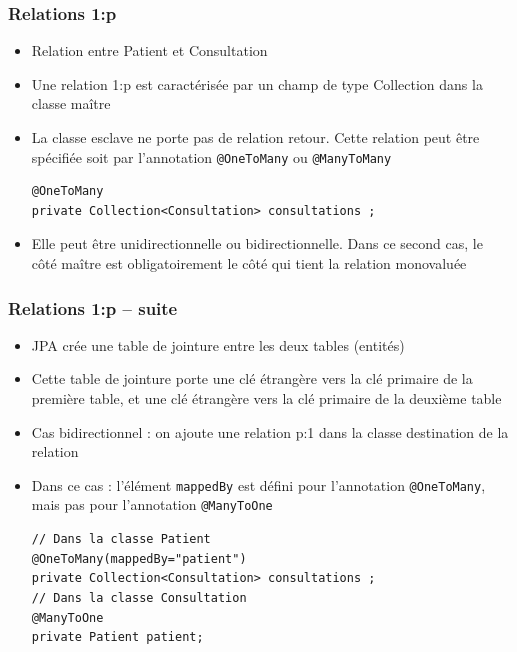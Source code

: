 \documentclass[aspectratio=169,10pt]{beamer}
\begin{document}
\begin{frame}[fragile]
	\frametitle{Relations 1:p}
	
	\begin{itemize}
		\item Relation entre Patient et Consultation 
		\item Une relation 1:p est caractérisée par un champ de type Collection dans la classe maître
		\item La classe esclave ne porte pas de relation retour. Cette relation peut être spécifiée soit par l'annotation \texttt{@OneToMany} ou \texttt{@ManyToMany}
\begin{lstlisting}
@OneToMany
private Collection<Consultation> consultations ;
\end{lstlisting}		
		\item Elle peut être unidirectionnelle ou bidirectionnelle. Dans ce second cas, le côté maître est obligatoirement le côté qui tient la relation monovaluée
	\end{itemize}

\end{frame}

\begin{frame}[fragile]
\frametitle{Relations 1:p -- suite}

\begin{itemize}
		\item JPA crée une table de jointure entre les deux tables (entités)
		\item Cette table de jointure porte une clé étrangère vers la clé primaire de la première table, et une clé étrangère vers la clé primaire de la deuxième table		
		\item Cas bidirectionnel :  on ajoute une relation p:1 dans la classe destination de la relation
		\item Dans ce cas : l'élément \texttt{mappedBy} est défini pour l'annotation \texttt{@OneToMany}, mais pas pour l'annotation \texttt{@ManyToOne}
\begin{lstlisting}
// Dans la classe Patient
@OneToMany(mappedBy="patient")
private Collection<Consultation> consultations ;
// Dans la classe Consultation
@ManyToOne
private Patient patient;
\end{lstlisting}		
	\end{itemize}
	
\end{frame}
\end{document}
